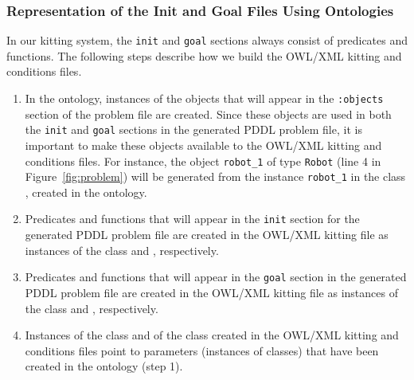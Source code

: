 \subsubsection{Representation of the Init and Goal Files Using Ontologies}
In our kitting system, the \texttt{init} and \texttt{goal} sections always consist of predicates and functions. The following steps describe how we build the OWL/XML kitting  and  conditions files.
\begin{enumerate}
 \item In the  ontology, instances of the objects that will appear in the \texttt{:objects} section of the problem file are created. Since these objects are used in both the \texttt{init} and \texttt{goal} sections in the generated PDDL problem file, it is important to make these objects available to the OWL/XML kitting  and  conditions files. For instance, the object \texttt{robot\_1} of type \texttt{Robot} (line 4 in Figure~\ref{fig:problem}) will be generated from the instance \texttt{robot\_1} in the class , created in the  ontology.
 \item Predicates and functions that will appear in the \texttt{init} section for the generated PDDL problem file are created in the OWL/XML kitting  file as instances of the class  and , respectively.
 \item Predicates and functions that will appear in the \texttt{goal} section in the generated PDDL problem file are created in the OWL/XML kitting  file as instances of the class  and , respectively.
 \item Instances of the class  and of the class  created in the OWL/XML kitting  and  conditions files point to parameters (instances of classes) that have been created in the  ontology (step 1).
\end{enumerate}


